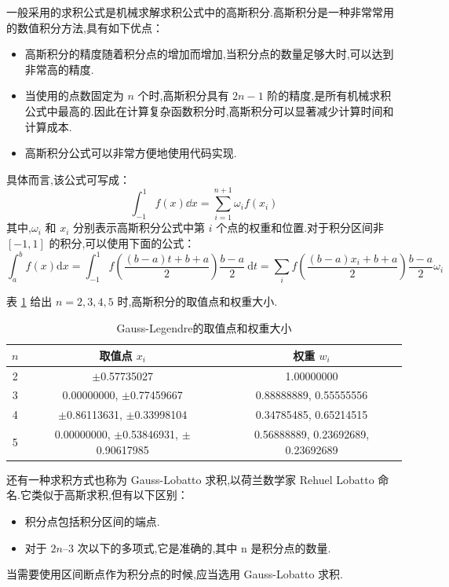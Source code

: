 \documentclass{book}
\begin{document}
一般采用的求积公式是机械求解求积公式中的高斯积分.高斯积分是一种非常常用的数值积分方法,具有如下优点：
\begin{itemize}
  \item 高斯积分的精度随着积分点的增加而增加,当积分点的数量足够大时,可以达到非常高的精度.
  \item 当使用的点数固定为 $n$ 个时,高斯积分具有 $2n-1$ 阶的精度,是所有机械求积公式中最高的.因此在计算复杂函数积分时,高斯积分可以显著减少计算时间和计算成本.
  \item 高斯积分公式可以非常方便地使用代码实现.
\end{itemize}
具体而言,该公式可写成：
\begin{equation}
  \int_{-1}^1 f(x)\dd x=\sum_{i=1}^{n+1}\omega_if(x_i)
\end{equation}
其中,$\omega_i$ 和 $x_i$ 分别表示高斯积分公式中第 $i$ 个点的权重和位置.对于积分区间非 $[-1,1]$ 的积分,可以使用下面的公式：
\begin{equation}
  \int_{a}^{b} f(x) \mathrm{d} x=\int_{-1}^{1} f\left(\frac{(b-a) t+b+a}{2}\right) \frac{b-a}{2} \mathrm{~d} t=\sum_i f(\frac{(b-a)x_i+b+a}{2})\frac{b-a}{2}\omega_i
\end{equation}

表 \ref{tab:Gauss-Legendre积分} 给出 $n=2,3,4,5$ 时,高斯积分的取值点和权重大小.
\begin{table}[ht]
  \centering
  \caption{Gauss-Legendre的取值点和权重大小}
  \label{tab:Gauss-Legendre积分}
  \begin{tabular}{ccc}
    \toprule
    $n$ & 取值点 $x_i$                                 & 权重 $w_i$                         \\
    \midrule
    2   & $\pm$0.57735027                              & 1.00000000                         \\
    3   & 0.00000000, $\pm$0.77459667                  & 0.88888889, 0.55555556             \\
    4   & $\pm$0.86113631, $\pm$0.33998104             & 0.34785485, 0.65214515             \\
    5   & 0.00000000, $\pm$0.53846931, $\pm$0.90617985 & 0.56888889, 0.23692689, 0.23692689 \\
    \bottomrule
  \end{tabular}
\end{table}


还有一种求积方式也称为 Gauss-Lobatto 求积,以荷兰数学家 Rehuel Lobatto 命名.它类似于高斯求积,但有以下区别：
\begin{itemize}
  \item 积分点包括积分区间的端点.
  \item 对于 $2n – 3$ 次以下的多项式,它是准确的,其中 n 是积分点的数量.
\end{itemize}
当需要使用区间断点作为积分点的时候,应当选用 Gauss-Lobatto 求积.
\end{document}

